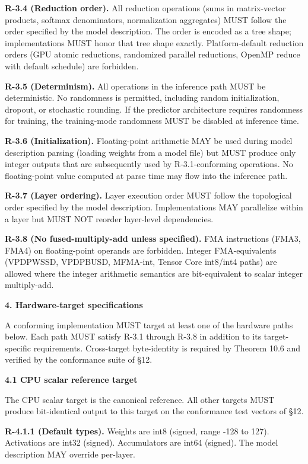 \documentclass[
]{article}
\begin{document}
\textbf{R-3.4 (Reduction order).} All reduction operations (sums in
matrix-vector products, softmax denominators, normalization aggregates)
MUST follow the order specified by the model description. The order is
encoded as a tree shape; implementations MUST honor that tree shape
exactly. Platform-default reduction orders (GPU atomic reductions,
randomized parallel reductions, OpenMP reduce with default schedule) are
forbidden.

\textbf{R-3.5 (Determinism).} All operations in the inference path MUST
be deterministic. No randomness is permitted, including random
initialization, dropout, or stochastic rounding. If the predictor
architecture requires randomness for training, the training-mode
randomness MUST be disabled at inference time.

\textbf{R-3.6 (Initialization).} Floating-point arithmetic MAY be used
during model description parsing (loading weights from a model file) but
MUST produce only integer outputs that are subsequently used by
R-3.1-conforming operations. No floating-point value computed at parse
time may flow into the inference path.

\textbf{R-3.7 (Layer ordering).} Layer execution order MUST follow the
topological order specified by the model description. Implementations
MAY parallelize within a layer but MUST NOT reorder layer-level
dependencies.

\textbf{R-3.8 (No fused-multiply-add unless specified).} FMA
instructions (FMA3, FMA4) on floating-point operands are forbidden.
Integer FMA-equivalents (VPDPWSSD, VPDPBUSD, MFMA-int, Tensor Core
int8/int4 paths) are allowed where the integer arithmetic semantics are
bit-equivalent to scalar integer multiply-add.

\textbf{4. Hardware-target specifications}

A conforming implementation MUST target at least one of the hardware
paths below. Each path MUST satisfy R-3.1 through R-3.8 in addition to
its target-specific requirements. Cross-target byte-identity is required
by Theorem 10.6 and verified by the conformance suite of §12.

\textbf{4.1 CPU scalar reference target}

The CPU scalar target is the canonical reference. All other targets MUST
produce bit-identical output to this target on the conformance test
vectors of §12.

\textbf{R-4.1.1 (Default types).} Weights are int8 (signed, range -128
to 127). Activations are int32 (signed). Accumulators are int64
(signed). The model description MAY override per-layer.
\end{document}
